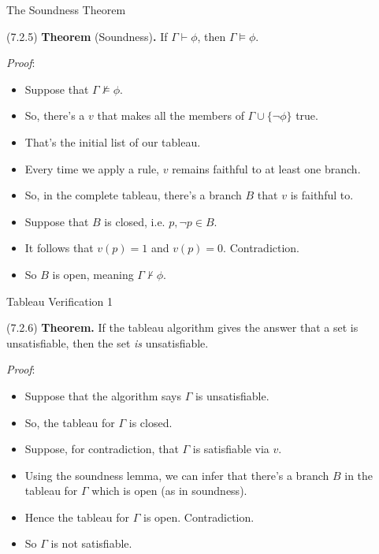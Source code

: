 \begin{frame}{The Soundness Theorem}

(7.2.5) \textbf{Theorem} (Soundness)\textbf{.} If $\Gamma\vdash\phi$, then $\Gamma\vDash\phi$.


	\emph{Proof}:

	\begin{itemize}
	
		\item Suppose that $\Gamma\nvDash\phi$.
		
		\item So, there's a $v$ that makes all the members of $\Gamma\cup\{\neg\phi\}$ true.
		
		\item That's the initial list of our tableau.
		
		\item Every time we apply a rule, $v$ remains faithful to at least one branch.
		
		\item So, in the complete tableau, there's a branch $B$ that $v$ is faithful to.
		
		\item Suppose that $B$ is closed, i.e. $p,\neg p\in B$. 
		
		\item It follows that $v(p)=1$ and $v(p)=0$. Contradiction.
		
		\item So $B$ is open, meaning $\Gamma\nvdash\phi$.
	
	\end{itemize}

\end{frame}

\begin{frame}{Tableau Verification 1}

	(7.2.6) \textbf{Theorem.} If the tableau algorithm gives the answer that a set is unsatisfiable, then the set \emph{is} unsatisfiable. 

	\emph{Proof}:
	
	\begin{itemize}
	
		\item Suppose that the algorithm says $\Gamma$ is unsatisfiable.
		
		\item So, the tableau for $\Gamma$ is closed.
		
		\item Suppose, for contradiction, that $\Gamma$ is satisfiable via $v$.
		
		\item Using the soundness lemma, we can infer that there's a branch $B$ in the tableau for $\Gamma$ which is open (as in soundness). 
	
		\item Hence the tableau for $\Gamma$ is open. Contradiction.
		
		\item So $\Gamma$ is not satisfiable.
	
	\end{itemize}

\end{frame}

